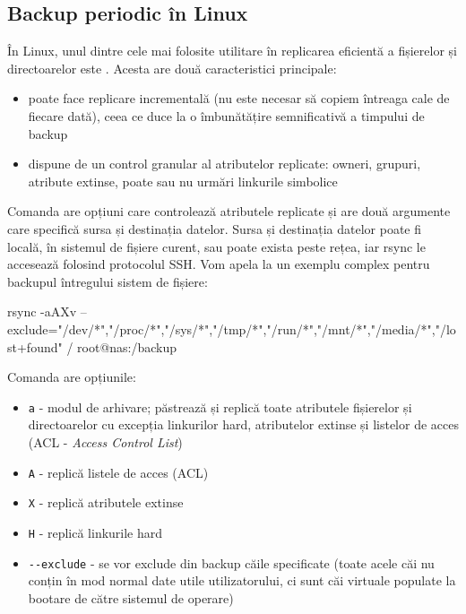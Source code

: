 \subsection{Backup periodic în Linux}
\label{sec:storage:backup:linux}

În Linux, unul dintre cele mai folosite utilitare în replicarea eficientă a fișierelor și directoarelor este .
Acesta are două caracteristici principale:

\begin{itemize}
  \item poate face replicare incrementală (nu este necesar să copiem întreaga cale de fiecare dată), ceea ce duce la o îmbunătățire semnificativă a timpului de backup
  \item dispune de un control granular al atributelor replicate: owneri, grupuri, atribute extinse, poate sau nu urmări linkurile simbolice
\end{itemize}

Comanda  are opțiuni care controlează atributele replicate și are două argumente care specifică sursa și destinația datelor.
 Sursa și destinația datelor poate fi locală, în sistemul de fișiere curent, sau poate exista peste rețea, iar rsync le accesează folosind protocolul SSH.
Vom apela la un exemplu complex pentru backupul întregului sistem de fișiere:

\begin{screen}
rsync -aAXv --exclude={"/dev/*","/proc/*","/sys/*","/tmp/*","/run/*","/mnt/*","/media/*","/lost+found"} / root@nas:/backup
\end{screen}

Comanda  are opțiunile:

\begin{itemize}
  \item \texttt{a} - modul de arhivare;
    păstrează și replică toate atributele fișierelor și directoarelor cu excepția linkurilor hard, atributelor extinse și listelor de acces (ACL - \textit{Access Control List})
  \item \texttt{A} - replică listele de acces (ACL)
  \item \texttt{X} - replică atributele extinse
  \item \texttt{H} - replică linkurile hard
  \item \texttt{-{}-exclude} - se vor exclude din backup căile specificate (toate acele căi nu conțin în mod normal date utile utilizatorului, ci sunt căi virtuale populate la bootare de către sistemul de operare)
\end{itemize}

